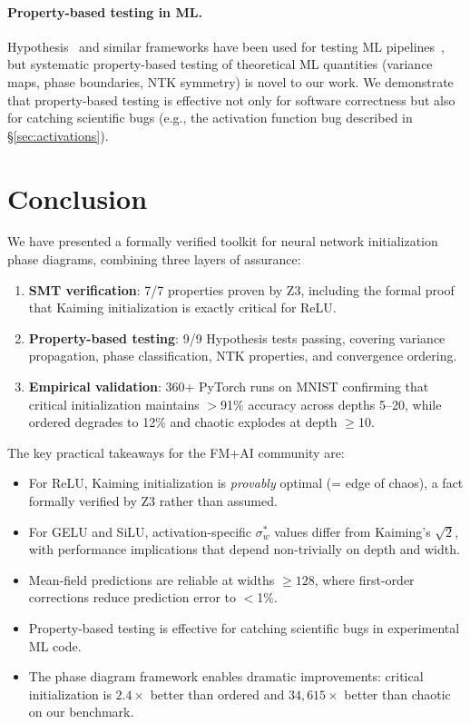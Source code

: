 \documentclass[10pt]{article}
\begin{document}
\paragraph{Property-based testing in ML.}
Hypothesis~\cite{maciver2019hypothesis} and similar frameworks have been used for testing ML pipelines~\cite{breck2017ml}, but systematic property-based testing of theoretical ML quantities (variance maps, phase boundaries, NTK symmetry) is novel to our work.
We demonstrate that property-based testing is effective not only for software correctness but also for catching scientific bugs (e.g., the activation function bug described in \S\ref{sec:activations}).

\section{Conclusion}
\label{sec:conclusion}

We have presented a formally verified toolkit for neural network initialization phase diagrams, combining three layers of assurance:

\begin{enumerate}[nosep]
    \item \textbf{SMT verification}: 7/7 properties proven by Z3, including the formal proof that Kaiming initialization is exactly critical for ReLU.
    \item \textbf{Property-based testing}: 9/9 Hypothesis tests passing, covering variance propagation, phase classification, NTK properties, and convergence ordering.
    \item \textbf{Empirical validation}: 360+ PyTorch runs on MNIST confirming that critical initialization maintains $>$91\% accuracy across depths 5--20, while ordered degrades to 12\% and chaotic explodes at depth $\geq$10.
\end{enumerate}

The key practical takeaways for the FM+AI community are:
\begin{itemize}[nosep]
    \item For ReLU, Kaiming initialization is \emph{provably} optimal (= edge of chaos), a fact formally verified by Z3 rather than assumed.
    \item For GELU and SiLU, activation-specific $\sigma_w^*$ values differ from Kaiming's $\sqrt{2}$, with performance implications that depend non-trivially on depth and width.
    \item Mean-field predictions are reliable at widths $\geq 128$, where first-order corrections reduce prediction error to $<$1\%.
    \item Property-based testing is effective for catching scientific bugs in experimental ML code.
    \item The phase diagram framework enables dramatic improvements: critical initialization is $2.4\times$ better than ordered and $34{,}615\times$ better than chaotic on our benchmark.
\end{itemize}
\end{document}
